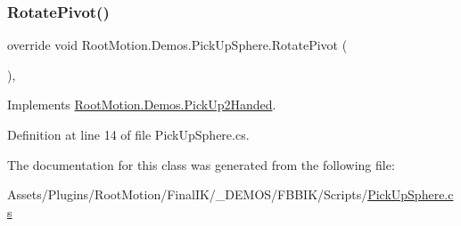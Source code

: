 \subsubsection{\texorpdfstring{Rotate\+Pivot()}{RotatePivot()}}
{\footnotesize\ttfamily override void Root\+Motion.\+Demos.\+Pick\+Up\+Sphere.\+Rotate\+Pivot (\begin{DoxyParamCaption}{ }\end{DoxyParamCaption})\hspace{0.3cm}{\ttfamily [protected]}, {\ttfamily [virtual]}}



Implements \mbox{\hyperlink{class_root_motion_1_1_demos_1_1_pick_up2_handed_af2cd4f4a54d4b2ee2d566f5541946f82}{Root\+Motion.\+Demos.\+Pick\+Up2\+Handed}}.



Definition at line 14 of file Pick\+Up\+Sphere.\+cs.



The documentation for this class was generated from the following file\+:\begin{DoxyCompactItemize}
\item 
Assets/\+Plugins/\+Root\+Motion/\+Final\+I\+K/\+\_\+\+D\+E\+M\+O\+S/\+F\+B\+B\+I\+K/\+Scripts/\mbox{\hyperlink{_pick_up_sphere_8cs}{Pick\+Up\+Sphere.\+cs}}\end{DoxyCompactItemize}
